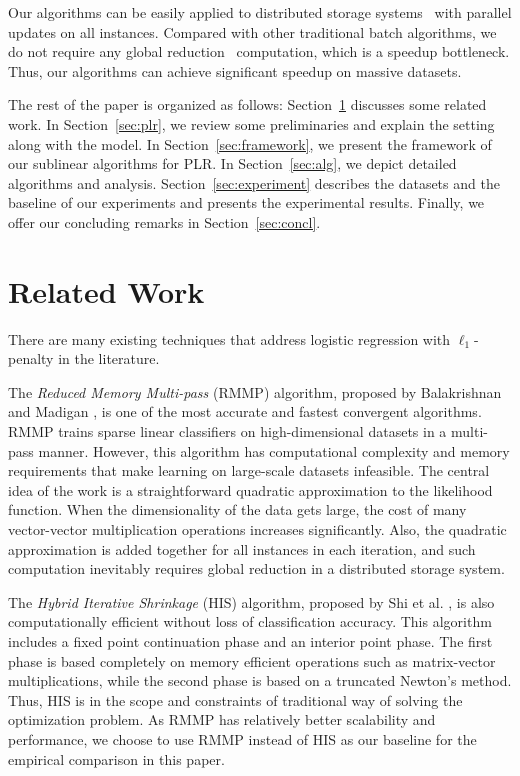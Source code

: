 \documentclass{llncs}
\begin{document}
Our algorithms can be easily applied to distributed storage systems~\cite{hogan1990livermore} with parallel updates on all instances.
Compared with other traditional batch algorithms, we do not require any global reduction~\cite{panda1995global} computation, which is a speedup bottleneck.
Thus, our algorithms can achieve significant speedup on massive datasets.
	
The rest of the paper is organized as follows:
Section~\ref{sec:rew} discusses some related work.
In Section~\ref{sec:plr}, we review some preliminaries and explain the setting along with the model.
In Section~\ref{sec:framework}, we present the framework of our sublinear algorithms for PLR.
In Section~\ref{sec:alg}, we depict detailed algorithms and analysis.
Section~\ref{sec:experiment} describes the datasets and the baseline of our experiments and presents the experimental results.
Finally, we offer our concluding remarks in Section~\ref{sec:concl}.

\section{Related Work} \label{sec:rew}
There are many existing techniques that address logistic regression with $\ell_1$-penalty in the literature.

The \textit{Reduced Memory Multi-pass} (RMMP) algorithm, proposed by Balakrishnan and Madigan \cite{balakrishnan2008algorithms}, is one of the most accurate and fastest convergent algorithms.
RMMP trains sparse linear classifiers on high-dimensional datasets in a multi-pass manner.
However, this algorithm has computational complexity and memory requirements that make learning on large-scale datasets infeasible.
The central idea of the work is a straightforward quadratic approximation to the likelihood function.
When the dimensionality of the data gets large, the cost of many vector-vector multiplication operations increases significantly.
Also, the quadratic approximation is added together for all instances in each iteration, and such computation inevitably requires global reduction in a distributed storage system.

The \textit{Hybrid Iterative Shrinkage} (HIS) algorithm, proposed by Shi et al. \cite{shi2008fast}, is also computationally efficient without loss of classification accuracy.
This algorithm includes a fixed point continuation phase and an interior point phase.
The first phase is based completely on memory efficient operations such as matrix-vector multiplications, while the second phase is based on a truncated Newton's method.
Thus, HIS is in the scope and constraints of traditional way of solving the optimization problem.
As RMMP has relatively better scalability and performance, we choose to use RMMP instead of HIS as our baseline for the empirical comparison in this paper.
\end{document}
